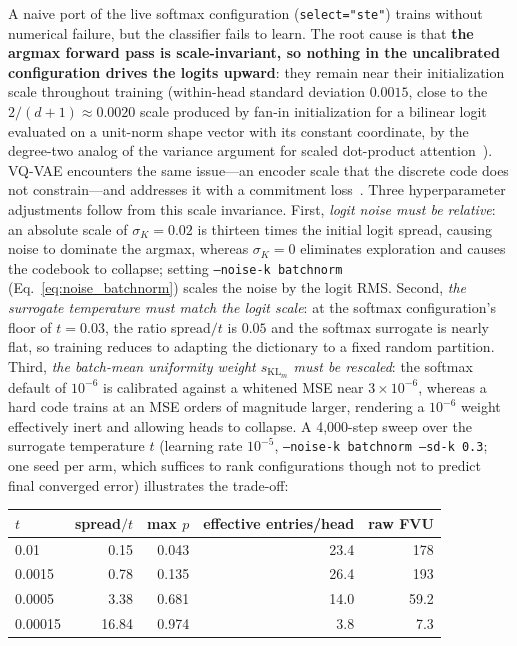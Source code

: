 A naive port of the live softmax configuration (\texttt{select="ste"})
trains without numerical failure, but the classifier fails to learn. The
root cause is that \textbf{the argmax forward pass is scale-invariant, so
nothing in the uncalibrated configuration drives the logits upward}: they
remain near their initialization scale throughout training (within-head
standard deviation $0.0015$, close to the $2/(d{+}1) \approx 0.0020$ scale
produced by fan-in initialization for a bilinear logit evaluated on a
unit-norm shape vector with its constant coordinate, by the degree-two
analog of the variance argument for scaled dot-product
attention~\cite[fn.~4]{vaswani2017}). VQ-VAE encounters the same
issue---an encoder scale that the discrete code does not constrain---and
addresses it with a commitment loss~\cite{vandenoord2017}. Three
hyperparameter adjustments follow from this scale invariance. First,
\emph{logit noise must be relative}: an absolute scale of
$\sigma_K{=}0.02$ is thirteen times the initial logit spread, causing
noise to dominate the argmax, whereas $\sigma_K{=}0$ eliminates
exploration and causes the codebook to collapse; setting \texttt{--noise-k
batchnorm} (Eq.~\eqref{eq:noise_batchnorm}) scales the noise by the
logit RMS. Second, \emph{the surrogate temperature must match the logit
scale}: at the softmax configuration's floor of $t{=}0.03$, the ratio
spread$/t$ is $0.05$ and the softmax surrogate is nearly flat, so training
reduces to adapting the dictionary to a fixed random partition. Third,
\emph{the batch-mean uniformity weight $s_{\mathrm{KL}_m}$ must be
rescaled}: the softmax default of $10^{-6}$ is calibrated against a
whitened MSE near $3\times10^{-6}$, whereas a hard code trains at an MSE
orders of magnitude larger, rendering a $10^{-6}$ weight effectively inert
and allowing heads to collapse. A 4{,}000-step sweep over the surrogate
temperature $t$ (learning rate $10^{-5}$, \texttt{--noise-k batchnorm
--sd-k 0.3}; one seed per arm, which suffices to rank configurations
though not to predict final converged error) illustrates the trade-off:

\begin{center}\small
\begin{tabular}{@{}lrrrr@{}}
\toprule
$t$ & spread$/t$ & max $p$ & effective entries/head & raw FVU \\
\midrule
0.01    & 0.15  & 0.043 & 23.4 & 178 \\
0.0015  & 0.78  & 0.135 & 26.4 & 193 \\
0.0005  & 3.38  & 0.681 & 14.0 & 59.2 \\
0.00015 & 16.84 & 0.974 & 3.8  & 7.3 \\
\bottomrule
\end{tabular}
\end{center}

